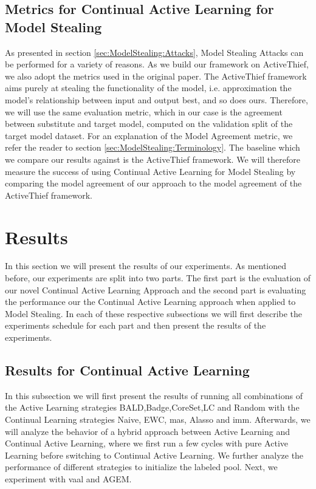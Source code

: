 \subsection{Metrics for Continual Active Learning for Model Stealing}
\label{sec:Evaluation:Metrics:CALMS}
As presented in section \ref{sec:ModelStealing:Attacks}, Model Stealing Attacks can be performed for a variety of reasons. As we build our framework on ActiveThief, we also
adopt the metrics used in the original paper. The ActiveThief framework aims purely at stealing the functionality of the model, i.e. approximation the model's relationship
between input and output best, and so does ours. Therefore, we will use the same evaluation metric, which in our case is the agreement between substitute and target model,
computed on the validation split of the target model dataset. For an explanation of the Model Agreement metric, we refer the reader to section \ref{sec:ModelStealing:Terminology}.
The baseline which we compare our results against is the ActiveThief framework. We will therefore measure the success of using Continual Active Learning for Model Stealing by comparing
the model agreement of our approach to the model agreement of the ActiveThief framework.

\section{Results}
\label{sec:Evaluation:Results}
In this section we will present the results of our experiments. As mentioned before, our experiments are split into two parts. The first part is the evaluation of our novel
Continual Active Learning Approach and the second part is evaluating the performance our the Continual Active Learning approach when applied to Model Stealing. In each of these
respective subsections we will first describe the experiments schedule for each part and then present the results of the experiments.

\subsection{Results for Continual Active Learning}
\label{sec:Evaluation:Results:CAL}
In this subsection we will first present the results of running all combinations of the Active Learning strategies BALD,Badge,CoreSet,LC and Random with the Continual Learning strategies
Naive, EWC, \gls{mas}, Alasso and \gls{imm}. Afterwards, we will analyze the behavior of a hybrid approach between Active Learning and Continual Active Learning, where we first run a few cycles with
pure Active Learning before switching to Continual Active Learning. We further analyze the performance of different strategies to initialize the labeled pool. Next, we experiment with \gls{vaal}
and AGEM.


